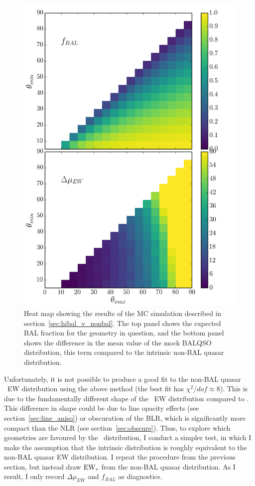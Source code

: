 \begin{figure} %
\centering
\includegraphics[width=1.0\textwidth]{figures/ewpaper/faceon_ew_c4_faceon_sdss.png}
\caption
{
Heat map showing the results of the MC simulation described in 
section~\ref{sec:hibal_v_nonbal}. The top panel shows the expected 
BAL fraction for the geometry in question, and the bottom
panel shows the difference in the mean value of the mock BALQSO distribution,
this term compared to the intrinsic non-BAL quasar distribution.
}
\label{fig:c4_faceon}
\end{figure} %

Unfortunately, it is not possible to produce a good fit to 
the non-BAL quasar \civline\ EW distribution using the above method 
(the best fit has $\chi^2/dof\approx8$).
This is due to the fundamentally different shape of the \civ\ EW distribution 
compared to \oiii. This difference in shape could be due to line opacity effects 
(see section~\ref{sec:line_aniso}) or obscuration of the BLR, which is significantly
more compact than the NLR (see section~\ref{sec:obscure}).
Thus, to explore which geometries are favoured by the \civ\ distribution,
I conduct a simpler test, in which I make the assumption that the intrinsic
distribution is roughly equivalent to the non-BAL quasar EW distribution.
I repeat the procedure from the previous section, but instead draw ${\rm EW}_*$
from the non-BAL quasar distribution. As I result, I only record $\Delta \mu_{EW}$
and $f_{BAL}$ as diagnostics. 

